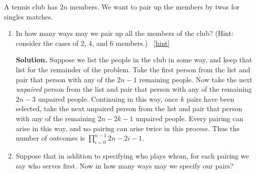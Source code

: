 \documentclass{book}
\begin{document}
\setcounter{project}{86}
\addtocounter{project}{-1}
\begin{activity}[]\label{tennispairings1}
\hypertarget{p-674}{}%
A tennis club has \(2n\) members. We want to pair up the members by twos for singles matches.%
\begin{enumerate}[font=\bfseries,label=(\alph*),ref=\alph*]
\item\label{task-134} \hypertarget{p-675}{}%
In how many ways may we pair up all the members of the club? (Hint: consider the cases of 2, 4, and 6 members.)%
~\hfill{\tiny\hyperlink{a-86.a}{[hint]}\hypertarget{q-86.a}{}}\par\smallskip%
\noindent\textbf{Solution.}\hypertarget{solution-63}{}\quad%
\hypertarget{p-677}{}%
Suppose we list the people in the club in some way, and keep that list for the remainder of the problem. Take the first person from the list and pair that person with any of the \(2n-1\) remaining people. Now take the next \emph{unpaired} person from the list and pair that person with any of the remaining \(2n-3\) unpaired people. Continuing in this way, once \(k\) pairs have been selected, take the next unpaired person from the list and pair that person with any of the remaining \(2n-2k-1\) unpaired people. Every pairing can arise in this way, and no pairing can arise twice in this process. Thus the number of outcomes is \(\prod_{i=0}^{n-1} 2n-2i-1\).%
\item\label{task-135} \hypertarget{p-678}{}%
Suppose that in addition to specifying who plays whom, for each pairing we say who serves first.  Now in how many ways may we specify our pairs?%
\end{enumerate}
\end{activity}
\end{document}
